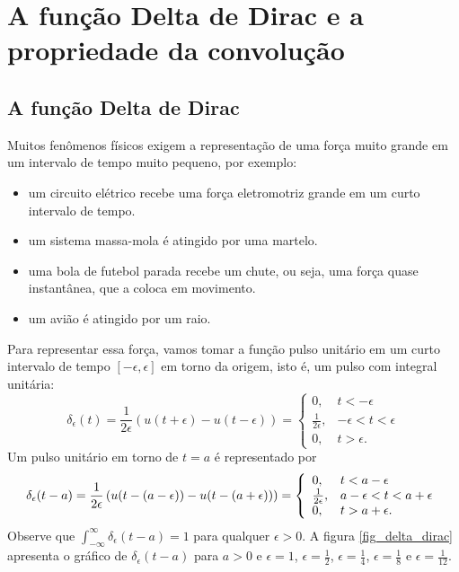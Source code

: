 \chapter{A função Delta de Dirac e a propriedade da convolução}
\section{A função Delta de Dirac}
Muitos fenômenos físicos exigem a representação de uma força muito grande em um intervalo de tempo muito pequeno, por exemplo:
\begin{itemize}
 \item um circuito elétrico recebe uma força eletromotriz grande em um curto intervalo de tempo.
 \item um sistema massa-mola é atingido por uma martelo.
 \item uma bola de futebol parada recebe um chute, ou seja, uma força quase instantânea, que a coloca em movimento.
 \item um avião é atingido por um raio.
\end{itemize}
Para representar essa força, vamos tomar a função pulso unitário em um curto intervalo de tempo $[-\epsilon,\epsilon]$ em torno da origem, isto é, um pulso com integral unitária:
\begin{equation}
\delta_\epsilon(t)=\frac{1}{2\epsilon}\left(u(t+\epsilon)-u(t-\epsilon)\right)=\left\{\begin{array}{ll}0,&t<-\epsilon\\ \frac{1}{2\epsilon},&-\epsilon<t<\epsilon\\0,&t>\epsilon.\end{array}\right.
\end{equation}
Um pulso unitário em torno de $t=a$ é representado por
\begin{equation}{\label{def_delta_dirac}}
\delta_\epsilon(t-a)=\frac{1}{2\epsilon}\left(u(t-(a-\epsilon))-u(t-(a+\epsilon))\right)=\left\{\begin{array}{ll}0,&t<a-\epsilon\\ \frac{1}{2\epsilon},&a-\epsilon<t<a+\epsilon\\0,&t>a+\epsilon.\end{array}\right.
\end{equation}
Observe que $\int_{-\infty}^\infty\delta_\epsilon(t-a)=1$ para qualquer $\epsilon>0$. A figura \ref{fig_delta_dirac} apresenta o gráfico de $\delta_\epsilon(t-a)$ para $a>0$ e $\epsilon=1$, $\epsilon=\frac{1}{2}$, $\epsilon=\frac{1}{4}$, $\epsilon=\frac{1}{8}$ e $\epsilon=\frac{1}{12}$.
